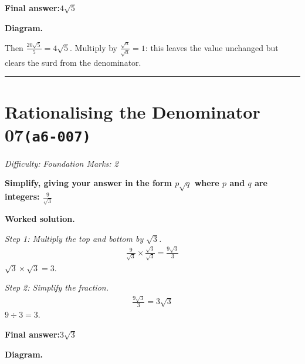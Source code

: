 \documentclass[11pt]{article}
\newcommand{\question}[1]{\par\medskip\noindent\textbf{#1}\par}
\begin{document}
\begin{answerbox}
\textbf{Final answer:}\quad \(\displaystyle 4\sqrt{5}\)
\end{answerbox}
\textbf{Diagram.}

\begin{center}
\end{center}
\small Then $\frac{20\sqrt5}{5}=4\sqrt5$. Multiply by $\frac{\sqrt{a}}{\sqrt{a}}=1$: this leaves the value unchanged but clears the surd from the denominator.\normalsize

\medskip\hrule

\section*{Rationalising the Denominator 07\quad\small\texttt{(a6-007)}}
\textit{Difficulty: Foundation \quad\textbar\quad Marks: 2}

\question{Simplify, giving your answer in the form \( p\sqrt{q} \) where \( p \) and \( q \) are integers: \( \frac{9}{\sqrt{3}} \)}

\textbf{Worked solution.}

\textit{Step 1: Multiply the top and bottom by \( \sqrt{3} \).}
\[\begin{gathered}
\frac{9}{\sqrt{3}} \times \frac{\sqrt{3}}{\sqrt{3}} = \frac{9\sqrt{3}}{3}
\end{gathered}\]
\( \sqrt{3} \times \sqrt{3} = 3 \).

\textit{Step 2: Simplify the fraction.}
\[\begin{gathered}
\frac{9\sqrt{3}}{3} = 3\sqrt{3}
\end{gathered}\]
\( 9 \div 3 = 3 \).

\begin{answerbox}
\textbf{Final answer:}\quad \(\displaystyle 3\sqrt{3}\)
\end{answerbox}
\textbf{Diagram.}
\end{document}
